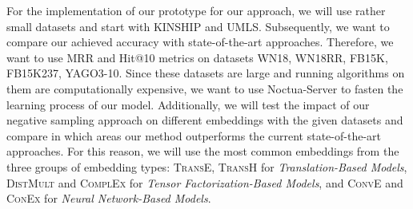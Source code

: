 For the implementation of our prototype for our approach, we will use rather small datasets and start with \textsc{KINSHIP} and \textsc{UMLS}.
Subsequently, we want to compare our achieved accuracy with state-of-the-art approaches.
Therefore, we want to use \ac{MRR} and Hit@10 metrics on datasets \textsc{WN18}, \textsc{WN18RR}, \textsc{FB15K}, \textsc{FB15K237}, \textsc{YAGO3-10}.
Since these datasets are large and running algorithms on them are computationally expensive, we want to use Noctua-Server to fasten the learning process of our model.
Additionally, we will test the impact of our negative sampling approach on different embeddings with the given datasets and compare in which areas our method outperforms the current state-of-the-art approaches.
For this reason, we will use the most common embeddings from the three groups of embedding types:
\textsc{TransE}, \textsc{TransH} for \textit{Translation-Based Models}, \textsc{DistMult} and \textsc{ComplEx} for \textit{Tensor Factorization-Based Models}, and \textsc{ConvE} and \textsc{ConEx} for \textit{Neural Network-Based Models}.



